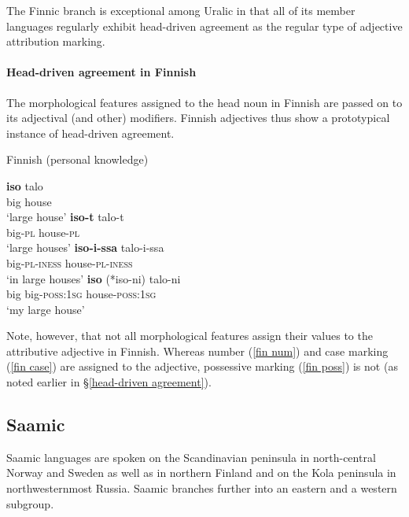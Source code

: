 The Finnic branch is exceptional among Uralic in that all of its member languages regularly exhibit head\hyp{}driven agreement as the regular type of adjective attribution marking.

\paragraph*{Head\hyp{}driven agreement in Finnish}
\label{finnish synchr}
The morphological features assigned to the head noun in Finnish are passed on to its adjectival (and other) modifiers. Finnish adjectives thus show a prototypical instance of head\hyp{}driven agreement. 
\begin{exe}
\ex \rm{Finnish (personal knowledge)}
\begin{xlist}
\ex
\gll	\textbf{iso} talo\\
	big house\\
\glt	‘large house’
\ex
\label{fin num}
 \gll	\textbf{iso-t} talo-t\\
	big-\textsc{pl} house-\textsc{pl}\\
\glt	‘large houses’
\ex
\label{fin case}
\gll	\textbf{iso-i-ssa}	talo-i-ssa\\
	big-\textsc{pl}-\textsc{iness} house-\textsc{pl}-\textsc{iness}\\
\glt	‘in large houses’
\ex 	
\label{fin poss}
\gll	\textbf{iso} {(*iso-ni)} talo-ni\\
	big big-\textsc{poss:1sg} house-\textsc{poss:1sg}\\
\glt	‘my large house’
\end{xlist}
\end{exe}
Note, however, that not all morphological features assign their values to the attributive adjective in Finnish. Whereas number (\ref{fin num}) and case marking (\ref{fin case}) are assigned to the adjective, possessive marking (\ref{fin poss}) is not (as noted earlier in \S\ref{head-driven agreement}).

\subsection{Saamic}
\label{saami synchr}
Saamic languages are spoken on the Scandinavian peninsula in north-central Norway and Sweden as well as in northern Finland and on the Kola peninsula in northwesternmost Russia. Saamic branches further into an eastern and a western subgroup.

